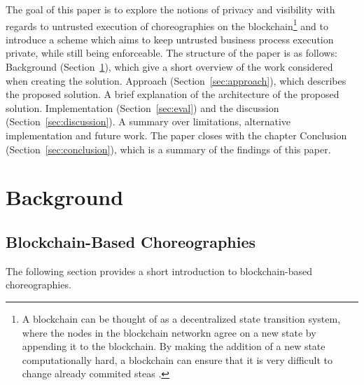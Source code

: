 \documentclass[runningheads]{llncs}
\newcommand{\refsec}[1]{Section~\ref{#1}}
\begin{document}
The goal of this paper is to explore the notions of privacy and visibility with regards to untrusted execution of choreographies on the blockchain\footnote{A blockchain can be thought of as a decentralized state transition system, where the nodes in the blockchain networkn agree on a new state by appending it to the blockchain. By making the addition of a new state computationally hard, a blockchain can ensure that it is very difficult to change already commited steas \cite{buterin2014next}. } and to introduce a scheme which aims to keep untrusted business process execution private, while still being enforceable. The structure of the paper is as follows: Background (\refsec{sec:background}), which give a short overview of the work considered when creating the solution. Approach (\refsec{sec:approach}), which describes the proposed solution. A brief explanation of the architecture of the proposed solution. Implementation (\refsec{sec:eval}) and the discussion (\refsec{sec:discussion}). A summary over limitations, alternative implementation and future work. The paper closes with the chapter Conclusion (\refsec{sec:conclusion}), which is a summary of the findings of this paper.

\section{Background} \label{sec:background}

\subsection{Blockchain-Based Choreographies} \label{subsec:blockchainbased}

The following section provides a short introduction to blockchain-based choreographies. 
\end{document}
